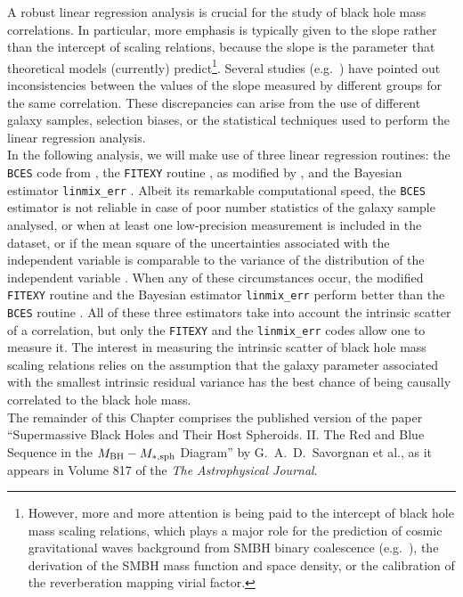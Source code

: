 A robust linear regression analysis is crucial for the study of black hole mass correlations.
In particular, more emphasis is typically given to the slope rather than the intercept of scaling relations, 
because the slope is the parameter that theoretical models (currently) 
predict\footnote{However, more and more attention is being paid to the intercept of black hole mass scaling relations, 
which plays a major role for the prediction of cosmic gravitational waves background from SMBH binary coalescence 
(e.g.~\citealt{shannon2015,shankar2016}), 
the derivation of the SMBH mass function and space density, 
or the calibration of the reverberation mapping virial factor. }. 
Several studies (e.g.~\citealt{tremaine2002,graham2007,tundo2007,graham2016review}) 
have pointed out inconsistencies between the values of the slope
measured by different groups for the same correlation. 
These discrepancies can arise from the use of different galaxy samples, 
selection biases, or the statistical techniques used to perform the linear regression analysis. \\

In the following analysis, we will make use of three linear regression routines: 
the {\tt BCES} code from \cite{akritasbershady1996}, 
the {\tt FITEXY} routine \citep{press1992}, as modified by \cite{tremaine2002}, 
and the Bayesian estimator {\tt linmix\_err} \citep{linmixerr}.
Albeit its remarkable computational speed, 
the {\tt BCES} estimator is not reliable in case of poor number statistics of the galaxy sample analysed, 
or when at least one low-precision measurement is included in the dataset, 
or if the mean square of the uncertainties associated with the independent variable is comparable to 
the variance of the distribution of the independent variable \citep{tremaine2002}. 
When any of these circumstances occur, 
the modified {\tt FITEXY} routine and the Bayesian estimator {\tt linmix\_err} 
perform better than the {\tt BCES} routine \citep{tremaine2002,novak2006,park2012}. 
All of these three estimators take into account the intrinsic scatter of a correlation, 
but only the {\tt FITEXY} and the {\tt linmix\_err} codes allow one to measure it. 
The interest in measuring the intrinsic scatter of black hole mass scaling relations 
relies on the assumption that 
the galaxy parameter associated with the smallest intrinsic residual variance 
has the best chance of being causally correlated to the black hole mass. \\

The remainder of this Chapter comprises the published version of the paper 
``Supermassive Black Holes and Their Host Spheroids. 
II. The Red and Blue Sequence in the $M_{\rm BH} - M_{\rm *,sph}$ Diagram'' 
by G.~A.~D.~Savorgnan et al.,  
as it appears in Volume 817 of the \emph{The Astrophysical Journal}. 


